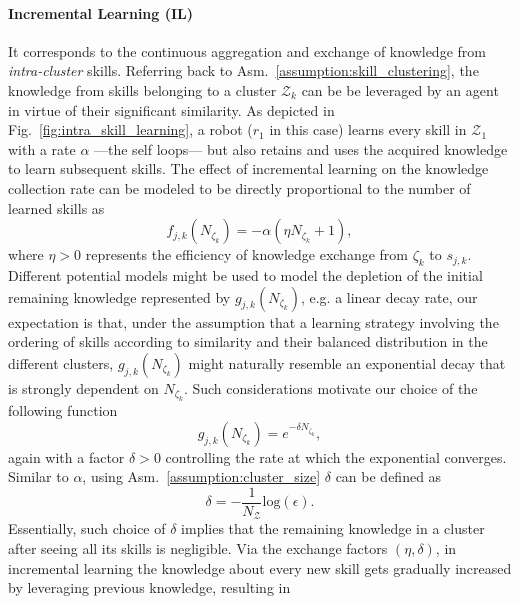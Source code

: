 \paragraph{\textbf{Incremental Learning (IL)}}
It corresponds to the continuous aggregation and exchange of knowledge from \emph{intra-cluster} skills. Referring back to Asm.~\ref{assumption:skill_clustering}, the knowledge from skills belonging to a cluster ${\mathcal{Z}_k}$ can be be leveraged by an agent in virtue of their significant similarity. As depicted in Fig.~\ref{fig:intra_skill_learning}, a robot ($r_1$ in this case) learns every skill in $\mathcal{Z}_1$ with a rate $\alpha$ ---the self loops--- but also retains and uses the acquired knowledge to learn subsequent skills. The effect of incremental learning on the knowledge collection rate can be modeled to be directly proportional to the number of learned skills as
\begin{equation}\label{eq:f_function_incremental}
	f_{j,k}\left(N_{\zeta_k}\right) = -\alpha\left(\eta N_{\zeta_k} + 1 \right), 
\end{equation}
where $\eta>0$ represents the efficiency of knowledge exchange from $\zeta_k$ to $s_{j,k}$. Different potential models might be used to model the depletion of the initial remaining knowledge represented by $g_{j,k}\left(N_{\zeta_k}\right)$, e.g. a linear decay rate, our expectation is that, under the assumption that a learning strategy involving the ordering of skills according to similarity and their balanced distribution in the different clusters, $g_{j,k}\left(N_{\zeta_k}\right)$ might naturally resemble an exponential decay that is strongly dependent on $N_{\zeta_k}$. Such considerations motivate our choice of the following function
\begin{equation}\label{eq:g_function_incremental}
	g_{j,k}\left(N_{\zeta_k}\right) = e^{-\delta N_{\zeta_k}},
\end{equation}
again with a factor $\delta>0$ controlling the rate at which the exponential converges. Similar to $\alpha$, using Asm.~\ref{assumption:cluster_size} $\delta$ can be defined as 
\begin{equation}\label{eq:delta}
	\delta = -\frac{1}{N_\mathcal{Z}}\text{log}(\epsilon).
\end{equation}
Essentially, such choice of $\delta$ implies that the remaining knowledge in a cluster after seeing all its skills is negligible. Via the exchange factors $(\eta,\delta)$, in incremental learning the knowledge about every new skill gets gradually increased by leveraging previous knowledge, resulting in
